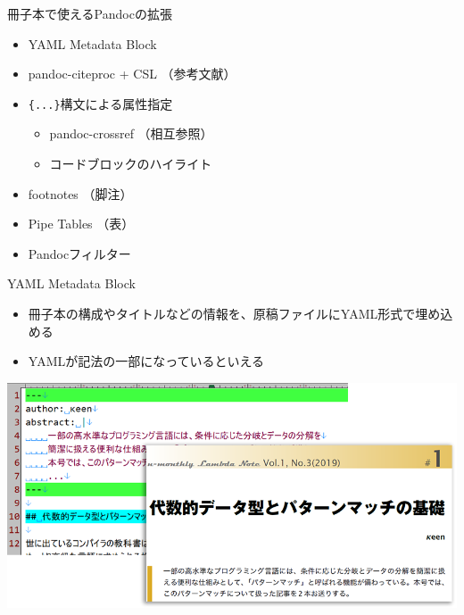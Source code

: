 \documentclass[14pt,dvipdfmx,uplatex]{beamer}
\begin{document}
\begin{frame}[t]{\inhibitglue 冊子本で使えるPandocの拡張}
  \sffamily
  \begin{itemize}
    \item YAML Metadata Block
    \item pandoc-citeproc + CSL （参考文献）
    \item \texttt{\{...\}}構文による属性指定 \\
    \begin{itemize}
      \item pandoc-crossref （相互参照）
      \item コードブロックのハイライト
    \end{itemize}
    \item footnotes （脚注）
    \item Pipe Tables （表）
    \item Pandocフィルター
  \end{itemize}
\end{frame}

\begin{frame}[t]{\inhibitglue YAML Metadata Block}
  \sffamily
  \begin{itemize}
    \item 冊子本の構成やタイトルなどの情報を、原稿ファイルにYAML形式で埋め込める
    \item YAMLが記法の一部になっているといえる
  \end{itemize}
  \begin{center}
  \includegraphics[width=.9\textwidth]{figures/yaml-header.png}\\
  \end{center}
\end{frame}
\end{document}
